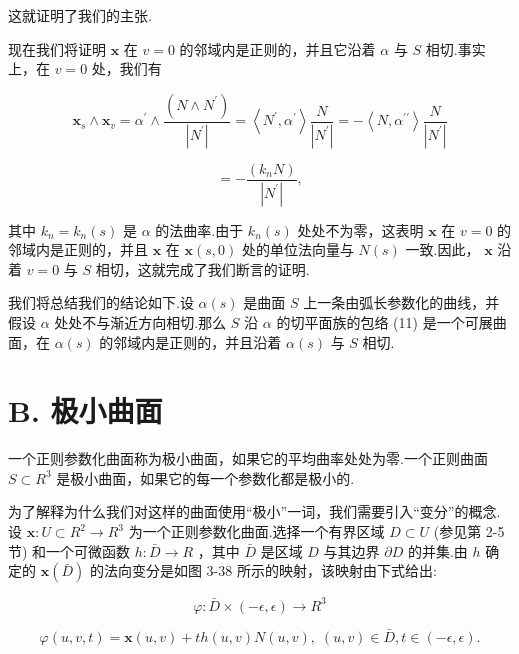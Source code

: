 这就证明了我们的主张.

现在我们将证明 \(\mathbf{x}\) 在 \(v = 0\) 的邻域内是正则的，并且它沿着 \(\alpha\) 与 \(S\) 相切.事实上，在 \(v = 0\) 处，我们有

\[
{\mathbf{x}}_{s} \land  {\mathbf{x}}_{v} = {\alpha }^{\prime } \land  \frac{\left( N \land  {N}^{\prime }\right) }{\left| {N}^{\prime }\right| } = \left\langle  {{N}^{\prime },{\alpha }^{\prime }}\right\rangle  \frac{N}{\left| {N}^{\prime }\right| } =  - \left\langle  {N,{\alpha }^{\prime \prime }}\right\rangle  \frac{N}{\left| {N}^{\prime }\right| }
\]

\[
=  - \frac{\left( {k}_{n}N\right) }{\left| {N}^{\prime }\right| },
\]

其中 \({k}_{n} = {k}_{n}\left( s\right)\) 是 \(\alpha\) 的法曲率.由于 \({k}_{n}\left( s\right)\) 处处不为零，这表明 \(\mathbf{x}\) 在 \(v = 0\) 的邻域内是正则的，并且 \(\mathbf{x}\) 在 \(\mathbf{x}\left( {s,0}\right)\) 处的单位法向量与 \(N\left( s\right)\) 一致.因此， \(\mathbf{x}\) 沿着 \(v = 0\) 与 \(S\) 相切，这就完成了我们断言的证明.

我们将总结我们的结论如下.设 \(\alpha \left( s\right)\) 是曲面 \(S\) 上一条由弧长参数化的曲线，并假设 \(\alpha\) 处处不与渐近方向相切.那么 \(S\) 沿 \(\alpha\) 的切平面族的包络 (11) 是一个可展曲面，在 \(\alpha \left( s\right)\) 的邻域内是正则的，并且沿着 \(\alpha \left( s\right)\) 与 \(S\) 相切.

\section*{B. 极小曲面}

一个正则参数化曲面称为极小曲面，如果它的平均曲率处处为零.一个正则曲面 \(S \subset  {R}^{3}\) 是极小曲面，如果它的每一个参数化都是极小的.

为了解释为什么我们对这样的曲面使用“极小”一词，我们需要引入“变分”的概念.设 \(\mathbf{x} : U \subset  {R}^{2} \rightarrow  {R}^{3}\) 为一个正则参数化曲面.选择一个有界区域 \(D \subset  U\) (参见第 2-5 节) 和一个可微函数 \(h : \bar{D} \rightarrow  R\) ，其中 \(\bar{D}\) 是区域 \(D\) 与其边界 \(\partial D\) 的并集.由 \(h\) 确定的 \(\mathbf{x}\left( \bar{D}\right)\) 的法向变分是如图 3-38 所示的映射，该映射由下式给出:

\[
\varphi  : \bar{D} \times  \left( {-\epsilon ,\epsilon }\right)  \rightarrow  {R}^{3}
\]

\[
\varphi \left( {u,v,t}\right)  = \mathbf{x}\left( {u,v}\right)  + {th}\left( {u,v}\right) N\left( {u,v}\right) ,\;\left( {u,v}\right)  \in  \bar{D},t \in  \left( {-\epsilon ,\epsilon }\right) .
\]

